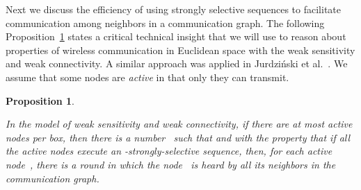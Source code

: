 \documentclass[11pt]{article}
\newtheorem{proposition}{Proposition}
\begin{document}
Next we discuss the efficiency of using strongly selective sequences to facilitate communication among neighbors in a communication graph.
The following Proposition~\ref{prop:SINR-and-boxes} states a critical technical insight that we will use to reason about properties of wireless communication in Euclidean space with the weak sensitivity and weak connectivity.
A similar approach was applied in Jurdzi\'nski et al.~\cite{JKS-ICALP-13}. 
We assume that some nodes are \emph{active} in that only they can transmit.




\begin{proposition}
\label{prop:SINR-and-boxes}

In the model of weak sensitivity and weak connectivity, if there are at most  active nodes per box, then there is a number~ such that  and with the property that if all the active nodes execute an -strongly-selective sequence, then, for each active node~, there is a round in which the node~  is heard by all its neighbors in the communication graph.
\end{proposition}
\end{document}
